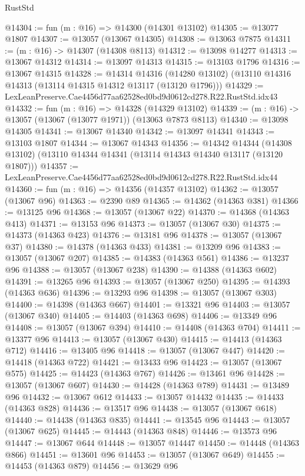 \begin{lexlean}{RustStd}
\begin{coremodule}
@14304 := fun (m : @16) => @14300 (@14301 @13102)
@14305 := @13077 @1807
@14307 := @13057 (@13067 @14305)
@14308 := @13063 @7875
@14311 := (m : @16) -> @14307 (@14308 @8113)
@14312 := @13098 @14277
@14313 := @13067 @14312
@14314 := @13097 @14313
@14315 := @13103 @1796
@14316 := @13067 @14315
@14328 := @14314
    @14316
    (@14280 @13102)
    (@13110 @14316 @14313 (@13114 @14315 @14312 @13117 (@13120 @1796)))
@14329 := LexLeanPreserve.Cae4456d77aa62528ed0bd9d0612cd278.R22.RustStd.idx43
@14332 := fun (m : @16) => @14328 (@14329 @13102)
@14339 := (m : @16) -> @13057 (@13067 (@13077 @1971)) (@13063 @7873 @8113)
@14340 := @13098 @14305
@14341 := @13067 @14340
@14342 := @13097 @14341
@14343 := @13103 @1807
@14344 := @13067 @14343
@14356 := @14342
    @14344
    (@14308 @13102)
    (@13110 @14344 @14341 (@13114 @14343 @14340 @13117 (@13120 @1807)))
@14357 := LexLeanPreserve.Cae4456d77aa62528ed0bd9d0612cd278.R22.RustStd.idx44
@14360 := fun (m : @16) => @14356 (@14357 @13102)
@14362 := @13057 (@13067 @96)
@14363 := @2390 @89
@14365 := @14362 (@14363 @381)
@14366 := @13125 @96
@14368 := @13057 (@13067 @22)
@14370 := @14368 (@14363 @413)
@14371 := @13153 @96
@14373 := @13057 (@13067 @30)
@14375 := @14373 (@14363 @423)
@14376 := @13181 @96
@14378 := @13057 (@13067 @37)
@14380 := @14378 (@14363 @433)
@14381 := @13209 @96
@14383 := @13057 (@13067 @207)
@14385 := @14383 (@14363 @561)
@14386 := @13237 @96
@14388 := @13057 (@13067 @238)
@14390 := @14388 (@14363 @602)
@14391 := @13265 @96
@14393 := @13057 (@13067 @250)
@14395 := @14393 (@14363 @636)
@14396 := @13293 @96
@14398 := @13057 (@13067 @303)
@14400 := @14398 (@14363 @667)
@14401 := @13321 @96
@14403 := @13057 (@13067 @340)
@14405 := @14403 (@14363 @698)
@14406 := @13349 @96
@14408 := @13057 (@13067 @394)
@14410 := @14408 (@14363 @704)
@14411 := @13377 @96
@14413 := @13057 (@13067 @430)
@14415 := @14413 (@14363 @712)
@14416 := @13405 @96
@14418 := @13057 (@13067 @447)
@14420 := @14418 (@14363 @722)
@14421 := @13433 @96
@14423 := @13057 (@13067 @575)
@14425 := @14423 (@14363 @767)
@14426 := @13461 @96
@14428 := @13057 (@13067 @607)
@14430 := @14428 (@14363 @789)
@14431 := @13489 @96
@14432 := @13067 @612
@14433 := @13057 @14432
@14435 := @14433 (@14363 @828)
@14436 := @13517 @96
@14438 := @13057 (@13067 @618)
@14440 := @14438 (@14363 @835)
@14441 := @13545 @96
@14443 := @13057 (@13067 @625)
@14445 := @14443 (@14363 @848)
@14446 := @13573 @96
@14447 := @13067 @644
@14448 := @13057 @14447
@14450 := @14448 (@14363 @866)
@14451 := @13601 @96
@14453 := @13057 (@13067 @649)
@14455 := @14453 (@14363 @879)
@14456 := @13629 @96

\end{coremodule}
\end{lexlean}
